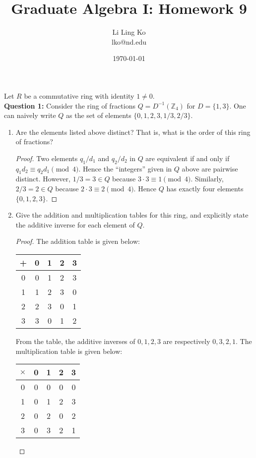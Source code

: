\documentclass{article}
\begin{document}
\title{Graduate Algebra I: Homework 9}
\author{Li Ling Ko\\ lko@nd.edu}
\date{\today}
\maketitle

Let $R$ be a commutative ring with identity $1\neq0$. \\

\textbf{Question 1:} Consider the ring of fractions
  $Q=D^{-1}(\mathbb{Z}_4)$ for $D=\{1,3\}$. One can naively write $Q$ as
  the set of elements $\{0,1,2,3,1/3,2/3\}$.
  \begin{enumerate}[label={\bf(\alph*)}]
    \item Are the elements listed above distinct? That is, what is the
      order of this ring of fractions?
      \begin{proof}
        Two elements $q_1/d_1$ and $q_2/d_2$ in $Q$ are equivalent if and
        only if $q_1d_2\equiv q_2d_1\pmod{4}$. Hence the ``integers'' given
        in $Q$ above are pairwise distinct. However, $1/3=3\in Q$
        because $3\cdot3\equiv1\pmod{4}$. Similarly,
        $2/3=2\in Q$ because $2\cdot3\equiv2\pmod{4}$. Hence $Q$ has
        exactly four elements $\{0,1,2,3\}$.
      \end{proof}

    \item Give the addition and multiplication tables for this ring, and
      explicitly state the additive inverse for each element of $Q$.
      \begin{proof}
        The addition table is given below:
        \begin{center}
          \begin{tabular}{c|cccc}
            + & 0 & 1 & 2 & 3 \\
            \hline
            0 & 0 & 1 & 2 & 3 \\
            1 & 1 & 2 & 3 & 0 \\
            2 & 2 & 3 & 0 & 1 \\
            3 & 3 & 0 & 1 & 2 \\
          \end{tabular}
        \end{center}
        From the table, the additive inverses of $0,1,2,3$ are respectively
        $0,3,2,1$. The multiplication table is given below:
        \begin{center}
          \begin{tabular}{c|cccc}
            $\times$ & 0 & 1 & 2 & 3 \\
            \hline
            0 & 0 & 0 & 0 & 0 \\
            1 & 0 & 1 & 2 & 3 \\
            2 & 0 & 2 & 0 & 2 \\
            3 & 0 & 3 & 2 & 1 \\
          \end{tabular}
        \end{center}
      \end{proof}


\end{enumerate}
\end{document}
